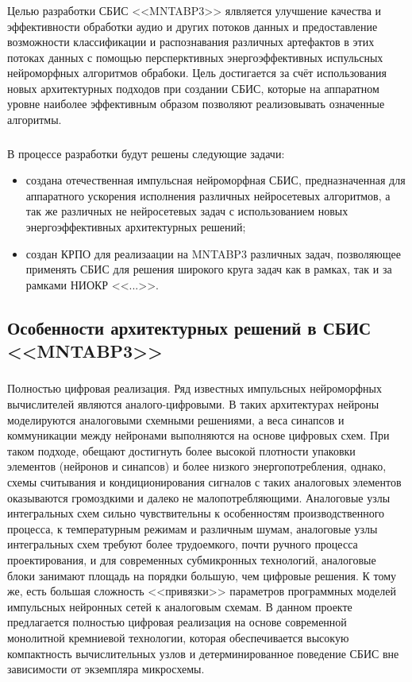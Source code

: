 \subsubsection{}
Целью разработки СБИС <<MNTABP3>> ялвляется улучшение качества и эффективности
обработки аудио и других потоков данных и предоставление возможности классификации
и распознавания различных артефактов в этих потоках данных с помощью
персперктивных энергоэффективных испульсных нейроморфных алгоритмов обрабоки.
Цель достигается за счёт использования новых архитектурных подходов при
создании СБИС, которые на аппаратном уровне наиболее эффективным образом
позволяют реализовывать означенные алгоритмы.

\subsubsection{}
В процессе разработки будут решены следующие задачи:
\begin{itemize}
\item создана отечественная импульсная нейроморфная СБИС, предназначенная
  для аппаратного ускорения исполнения различных нейросетевых алгоритмов, а так
  же различных не нейросетевых задач
  с использованием новых энергоэффективных архитектурных решений;
\item создан КРПО для реализаации на MNTABP3 различных
  задач, позволяющее применять СБИС для решения широкого круга задач как в рамках,
  так и за рамками НИОКР <<...>>.
\end{itemize}

\subsection{Особенности архитектурных решений в СБИС <<MNTABP3>>}

\subsubsection{}
Полностью цифровая реализация.
Ряд известных импульсных нейроморфных вычислителей являются
аналого-цифровыми. В таких архитектурах нейроны моделируются аналоговыми схемными
решениями, а веса синапсов и коммуникации между нейронами выполняются на основе
цифровых схем.
При таком подходе, обещают достигнуть более высокой плотности упаковки
элементов (нейронов и синапсов) и более низкого энергопотребления, однако,
схемы считывания и кондиционирования сигналов с таких аналоговых элементов
оказываются громоздкими и далеко не малопотребляющими. Аналоговые узлы
интегральных схем сильно чувствительны к особенностям производственного
процесса, к температурным режимам и различным шумам, аналоговые узлы
интегральных схем требуют более трудоемкого, почти ручного процесса
проектирования, и для современных субмикронных технологий, аналоговые блоки
занимают площадь на порядки большую, чем цифровые решения. К тому же, есть
большая сложность <<привязки>> параметров программных моделей импульсных
нейронных сетей к аналоговым схемам. В данном проекте предлагается полностью
цифровая реализация на основе современной монолитной кремниевой технологии,
которая обеспечивается высокую компактность вычислительных узлов и
детерминированное поведение СБИС вне зависимости от экземпляра микросхемы.

